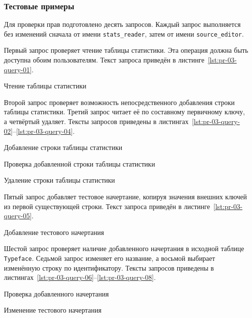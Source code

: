 \subsubsection{Тестовые примеры}

Для проверки прав подготовлено десять запросов. Каждый запрос выполняется без
изменений сначала от имени \texttt{stats_reader}, затем от имени
\texttt{source_editor}.

Первый запрос проверяет чтение таблицы статистики. Эта операция должна быть
доступна обоим пользователям. Текст запроса приведён в
листинге~\ref{lst:pr-03-query-01}.

{Чтение таблицы статистики}
{\label{lst:pr-03-query-01}}

Второй запрос проверяет возможность непосредственного добавления строки
таблицы статистики. Третий запрос читает её по составному первичному ключу,
а четвёртый удаляет. Тексты запросов приведены в
листингах~\ref{lst:pr-03-query-02}--\ref{lst:pr-03-query-04}.

{Добавление строки таблицы статистики}
{\label{lst:pr-03-query-02}}

{Проверка добавленной строки таблицы статистики}
{\label{lst:pr-03-query-03}}

{Удаление строки таблицы статистики}
{\label{lst:pr-03-query-04}}

Пятый запрос добавляет тестовое начертание, копируя значения внешних
ключей из первой существующей строки. Текст запроса приведён в
листинге~\ref{lst:pr-03-query-05}.

{Добавление тестового начертания}
{\label{lst:pr-03-query-05}}

Шестой запрос проверяет наличие добавленного начертания в исходной таблице
\texttt{Typeface}. Седьмой запрос изменяет его название, а восьмой
выбирает изменённую строку по идентификатору. Тексты запросов приведены в
листингах~\ref{lst:pr-03-query-06}--\ref{lst:pr-03-query-08}.

{Проверка добавленного начертания}
{\label{lst:pr-03-query-06}}

{Изменение тестового начертания}
{\label{lst:pr-03-query-07}}

